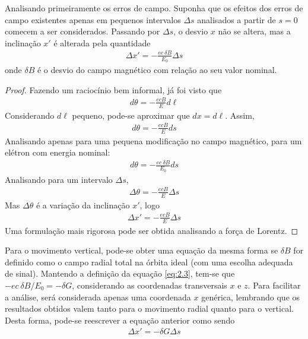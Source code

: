 Analisando primeiramente os erros de campo. Suponha que os efeitos dos erros de campo existentes apenas em pequenos intervalos $\Delta s$ analisados a partir de $s=0$ comecem a ser considerados. Passando por $\Delta s$, o desvio $x$ não se altera, mas a inclinação $x'$ é alterada pela quantidade
\begin{align}
	\Delta x' = -\frac{ec\ \delta B}{E_0}\Delta s
\end{align}
onde $\delta B$ é o desvio do campo magnético com relação ao seu valor nominal.

\begin{proof}
	Fazendo um raciocínio bem informal, já foi visto que
	\begin{align*}
		d\theta = -\frac{ecB}{E}d\ell
	\end{align*}
	Considerando $d\ell$ pequeno, pode-se aproximar que $dx = d\ell$. Assim,
	\begin{align*}
		d\theta = -\frac{ecB}{E}ds
	\end{align*}
	Analisando apenas para uma pequena modificação no campo magnético, para um elétron com energia nominal:
	\begin{align*}
		d\theta = -\frac{ec\ \delta B}{E_0}ds
	\end{align*}
	Analisando para um intervalo $\Delta s$,
	\begin{align*}
		\Delta\theta = -\frac{ecB}{E}\Delta s
	\end{align*}
	Mas $\Delta \theta$ é a variação da inclinação $x'$, logo
	\begin{align*}
		\Delta x' = -\frac{ecB}{E}\Delta s
	\end{align*}
	Uma formulação mais rigorosa pode ser obtida analisando a força de Lorentz.
\end{proof}

Para o movimento vertical, pode-se obter uma equação da mesma forma se $\delta B$ for definido como o campo radial total na órbita ideal (com uma escolha adequada de sinal). Mantendo a definição da equação \eqref{eq:2.3}, tem-se que $-ec\ \delta B/E_0 = -\delta G$, considerando as coordenadas transversais $x$ e $z$. Para facilitar a análise, será considerada apenas uma coordenada $x$ genérica, lembrando que os resultados obtidos valem tanto para o movimento radial quanto para o vertical. Desta forma, pode-se reescrever a equação anterior como sendo
\begin{align}
	\Delta x' = -\delta G \Delta s\label{eq:2.84}
\end{align}

